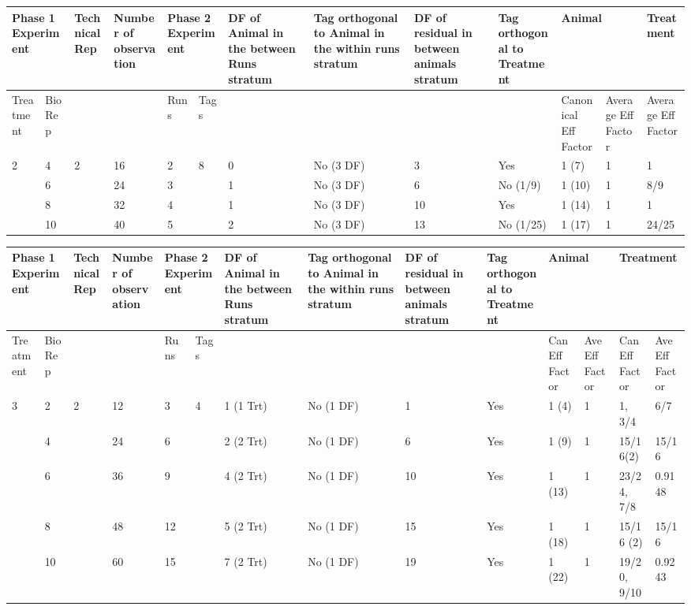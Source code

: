\begin{tabular}{|p{0.5in}|p{0.4in}|p{0.5in}|p{0.7in}|p{0.3in}|p{0.3in}|p{0.7in}|p{0.7in}|p{0.6in}|p{0.6in}|p{0.5in}|p{0.5in}|p{0.6in}|} \hline 
\multicolumn{2}{|p{1in}|}{Phase 1 Experiment} & Technical Rep & Number of observation  & \multicolumn{2}{|p{0.7in}|}{Phase 2 Experiment} & DF of Animal in the between Runs stratum  & Tag orthogonal to Animal in the within runs stratum & DF of residual in between animals stratum & Tag orthogonal to Treatment & \multicolumn{2}{|p{1.0in}|}{Animal} & Treatment \\ \hline 
Treatment & Bio Rep &  &  & Runs & Tags  &  &  &  &  & Canonical Eff Factor & Average Eff Factor & Average Eff Factor \\ \hline 
2 & 4 & 2 & 16 & 2 & 8\newline \newline  & 0 & No (3 DF) & 3 & Yes & 1 (7) & 1 & 1 \\ \hline 
 & 6 &  & 24 & 3 &  & 1 & No (3 DF) & 6 & No (1/9) & 1 (10) & 1 & 8/9 \\ \hline 
 & 8 &  & 32 & 4 &  & 1 & No (3 DF) & 10 & Yes & 1 (14) & 1 & 1 \\ \hline 
 & 10 &  & 40 & 5 &  & 2 & No (3 DF) & 13 & No (1/25) & 1 (17) & 1 & 24/25 \\ \hline 
\end{tabular}



\noindent  

\noindent \eject 

\begin{tabular}{|p{0.5in}|p{0.3in}|p{0.5in}|p{0.7in}|p{0.3in}|p{0.3in}|p{0.7in}|p{0.7in}|p{0.6in}|p{0.6in}|p{0.4in}|p{0.4in}|p{0.5in}|p{0.4in}|} \hline 
\multicolumn{2}{|p{1in}|}{Phase 1 Experiment} & Technical Rep & Number of observation  & \multicolumn{2}{|p{0.7in}|}{Phase 2 Experiment} & DF of Animal in the between Runs stratum  & Tag orthogonal to Animal in the within runs stratum & DF of residual in between animals stratum & Tag orthogonal to Treatment & \multicolumn{2}{|p{0.8in}|}{Animal} & \multicolumn{2}{|p{0.9in}|}{Treatment} \\ \hline 
Treatment & Bio Rep &  &  & Runs & Tags  &  &  &  &  & Can Eff Factor & Ave Eff Factor & Can Eff Factor & Ave Eff Factor \\ \hline 
3 & 2 & 2 & 12 & 3 & 4 & 1 (1 Trt)  & No (1 DF) & 1 & Yes & 1 (4) & 1 & 1,  3/4 & 6/7 \\ \hline 
 & 4 &  & 24 & 6 &  & 2 (2 Trt) & No (1 DF) & 6 & Yes & 1 (9) & 1 & 15/16(2) & 15/16 \\ \hline 
 & 6 &  & 36 & 9 &  & 4 (2 Trt) & No (1 DF) & 10 & Yes & 1 (13) & 1 & 23/24,   7/8 & 0.9148 \\ \hline 
 & 8 &  & 48 & 12 &  & 5 (2 Trt) & No (1 DF) & 15 & Yes & 1 (18) & 1 & 15/16 (2) & 15/16 \\ \hline 
 & 10 &  & 60 & 15 &  & 7 (2 Trt) & No (1 DF) & 19 & Yes & 1 (22) & 1 & 19/20,  9/10 & 0.9243 \\ \hline 
\end{tabular}



